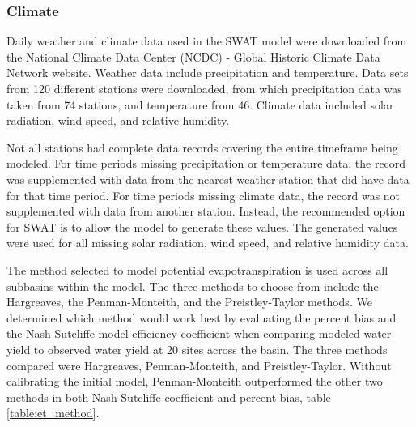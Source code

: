 \subsubsection{Climate}	\label{sec:climate}


Daily weather and climate data used in the SWAT model were downloaded from the National Climate Data Center (NCDC) - Global Historic Climate Data Network website. Weather data include precipitation and temperature.  Data sets from 120 different stations were downloaded, from which precipitation data was taken from 74 stations, and temperature from 46. Climate data included solar radiation, wind speed, and relative humidity.   

Not all stations had complete data records covering the entire timeframe being modeled.  For time periods missing precipitation or temperature data, the record was supplemented with data from the nearest weather station that did have data for that time period.  For time periods missing climate data, the record was not supplemented with data from another station.  Instead, the recommended option for SWAT is to allow the model to generate these values.  The generated values were used for all missing solar radiation, wind speed, and relative humidity data. 

The method selected to model potential evapotranspiration is used across all subbasins within the model.  The three methods to choose from include the Hargreaves, the Penman-Monteith, and the Preistley-Taylor methods.  We determined which method would work best by evaluating the percent bias and the Nash-Sutcliffe model efficiency coefficient  when comparing modeled water yield to observed water yield at 20 sites across the basin. The three methods compared were Hargreaves, Penman-Monteith, and Preistley-Taylor. Without calibrating the initial model, Penman-Monteith outperformed the other two methods in both Nash-Sutcliffe coefficient and percent bias, table \ref{table:et_method}.

